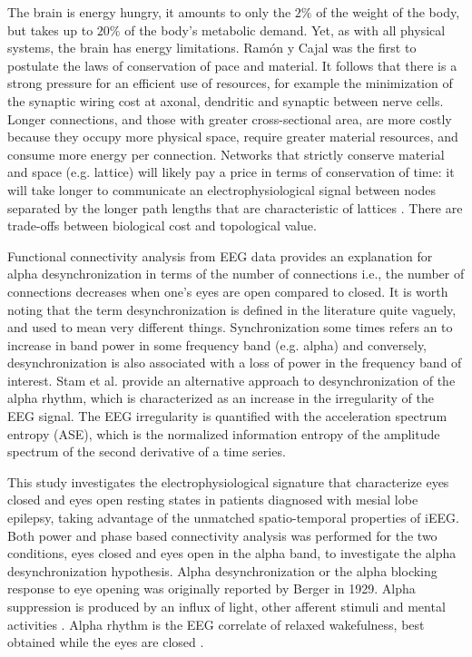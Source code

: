 \documentclass[11pt, onecolumn]{article}
\begin{document}
The  brain  is energy  hungry,  it  amounts  to  only the  $2\%$ of the  weight  of the  body,  but  takes  up  to  $20\%$ of the  body's  metabolic demand. Yet, as with all physical systems, the brain has energy limitations. Ram{\'o}n y Cajal was the first to postulate the laws of conservation of pace and material. 
It follows that there is a strong pressure for an efficient use of resources, for example the minimization of the synaptic wiring cost at axonal, dendritic and synaptic between nerve cells.
Longer connections, and those with greater cross-sectional area, are more costly because they occupy more physical space, require greater material resources, and consume more energy per connection. Networks that strictly conserve material and space (e.g. lattice) will likely pay a price in terms of conservation of time: it will take longer to communicate an electrophysiological signal between nodes separated by the longer path lengths that are characteristic of lattices \citep{fornito2016fundamentals}. There are trade-offs between biological cost and topological value.

Functional connectivity analysis from EEG data provides an explanation for alpha desynchronization in terms of the number of connections i.e., the number of connections decreases when one's eyes are open compared to closed. It is worth noting that the term desynchronization is defined in the literature quite vaguely, and used to mean very different things. Synchronization some times refers an to increase in band power in some frequency band (e.g. alpha) and conversely, desynchronization is also associated with a loss of power in the frequency band of interest. 
Stam et al.\citep{stam1993quantification} provide an alternative approach to desynchronization of the alpha rhythm, which is characterized as an increase in the irregularity of the EEG signal. The EEG irregularity is quantified with the acceleration spectrum entropy (ASE), which is the normalized information entropy of the amplitude spectrum of the second derivative of a time series.

This study investigates the electrophysiological signature that characterize eyes closed and eyes open resting states in patients  diagnosed with mesial lobe epilepsy, taking advantage of the unmatched spatio-temporal properties of iEEG. Both power and phase based connectivity analysis was performed for the two conditions, eyes closed and eyes open in the alpha band, to investigate the alpha desynchronization hypothesis.
Alpha desynchronization or the alpha blocking response to eye opening was originally reported by Berger in 1929. Alpha suppression is produced by an influx of light, other afferent stimuli and mental activities \citep{schomer2012niedermeyer}. Alpha rhythm is the EEG correlate of relaxed wakefulness, best obtained while the eyes are closed  \citep{niedermeyer2005electroencephalography}. 
 
\end{document}
